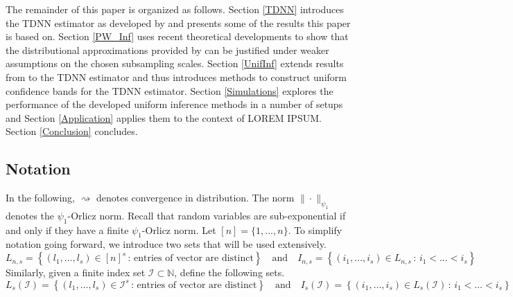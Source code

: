 \documentclass[letterpaper,10pt]{article}
\numberwithin{equation}{section}
\numberwithin{thm}{section}
\numberwithin{lem}{section}
\numberwithin{cor}{section}
\newcommand{\1}{\mathbb{1}}
\begin{document}
The remainder of this paper is organized as follows.
Section \ref{TDNN} introduces the TDNN estimator as developed by \citet{demirkaya_optimal_2024} and presents some of the results this paper is based on.
Section \ref{PW_Inf} uses recent theoretical developments to show that the distributional approximations provided by \citet{demirkaya_optimal_2024} can be justified under weaker assumptions on the chosen subsampling scales.
Section \ref{UnifInf} extends results from \citet{ritzwoller_uniform_2024} to the TDNN estimator and thus introduces methods to construct uniform confidence bands for the TDNN estimator.
Section \ref{Simulations} explores the performance of the developed uniform inference methods in a number of setups and Section \ref{Application} applies them to the context of {\color{red} LOREM IPSUM}.
Section \ref{Conclusion} concludes.

\subsection{Notation}
In the following, $\rightsquigarrow$ denotes convergence in distribution.
The norm $\| \cdot \|_{\psi_1}$ denotes the $\psi_1$-Orlicz norm.
Recall that random variables are sub-exponential if and only if they have a finite $\psi_1$-Orlicz norm.
Let $[n] = \{1, \dotsc, n\}$.
To simplify notation going forward, we introduce two sets that will be used extensively.
\begin{equation}
	L_{n,s} = \left\{\left(l_1, \dotsc, l_s\right) \in [n]^{s} \, : \, \text{entries of vector are distinct} \right\}
	\quad \text{and} \quad
	I_{n,s} = \left\{\left(i_1, \dotsc, i_s\right) \in L_{n,s} \, : \, i_1 < \dotsc < i_s \right\}
\end{equation}
Similarly, given a finite index set $\mathcal{I} \subset \mathbb{N}$, define the following sets.
\begin{equation}
	L_{s}(\mathcal{I}) = \left\{\left(l_1, \dotsc, l_s\right) \in \mathcal{I}^{s} \, : \, \text{entries of vector are distinct} \right\}
	\quad \text{and} \quad
	I_{s}(\mathcal{I}) = \left\{\left(i_1, \dotsc, i_s\right) \in L_{s}(\mathcal{I}) \, : \, i_1 < \dotsc < i_s \right\}
\end{equation}


\newpage
\end{document}
